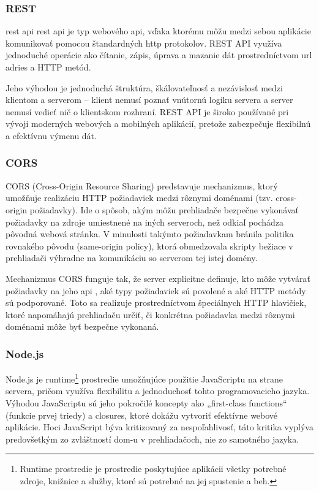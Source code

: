  \subsubsection{REST}
 \acrshort{rest} \acrshort{api} \acrfull{rest} \acrfull{api} je typ webového \acrshort{api}, vďaka ktorému môžu medzi sebou aplikácie komunikovať pomocou štandardných \acrshort{http} protokolov. 
 REST API využíva jednoduché operácie ako čítanie, zápis, úprava a mazanie dát prostredníctvom \acrshort{url} adries a HTTP metód.

Jeho výhodou je jednoduchá štruktúra, škálovateľnosť a nezávislosť medzi klientom a serverom – klient nemusí poznať vnútornú logiku servera a server nemusí vedieť nič o klientskom rozhraní.
 REST API je široko používané pri vývoji moderných webových a mobilných aplikácií, pretože zabezpečuje flexibilnú a efektívnu výmenu dát.\cite{rest}
\subsubsection{CORS}
CORS (Cross-Origin Resource Sharing) predstavuje mechanizmus, ktorý umožňuje realizáciu HTTP požiadaviek medzi rôznymi doménami (tzv. cross-origin požiadavky).
 Ide o spôsob, akým môžu prehliadače bezpečne vykonávať požiadavky na zdroje umiestnené na iných serveroch, než odkiaľ pochádza pôvodná webová stránka. 
 V minulosti takýmto požiadavkam bránila politika rovnakého pôvodu (same-origin policy), ktorá obmedzovala skripty bežiace v prehliadači výhradne na komunikáciu so serverom tej istej domény.

Mechanizmus CORS funguje tak, že server explicitne definuje, kto môže vytvárať požiadavky na jeho \acrshort{api}
, aké typy požiadaviek sú povolené a aké HTTP metódy sú podporované.
 Toto sa realizuje prostredníctvom špeciálnych HTTP hlavičiek, ktoré napomáhajú prehliadaču určiť, či konkrétna požiadavka medzi rôznymi doménami môže byť bezpečne vykonaná.\cite{CORS}
\subsubsection{Node.js}
Node.js je runtime\footnote{Runtime prostredie je prostredie poskytujúce aplikácii všetky potrebné zdroje, knižnice a služby, ktoré sú potrebné na jej spustenie a beh.}
prostredie umožňujúce použitie JavaScriptu na strane servera, pričom využíva flexibilitu a jednoduchosť tohto programovacieho jazyka.
 Výhodou JavaScriptu sú jeho pokročilé koncepty ako „first-class functions“ (funkcie prvej triedy) a closures, ktoré dokážu vytvoriť efektívne webové aplikácie. 
 Hoci JavaScript býva kritizovaný za nespoľahlivosť, táto kritika vyplýva predovšetkým zo zvláštností \acrshort{dom}-u v prehliadačoch, nie zo samotného jazyka.
